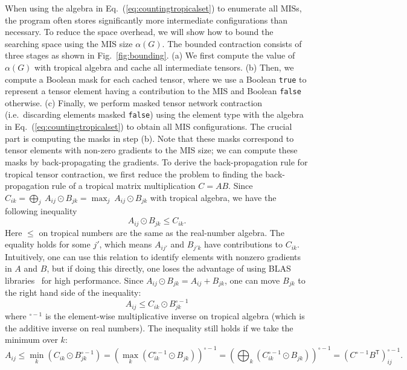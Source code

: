 \documentclass[onefignum, onetabnum]{siamart190516}
\newcommand{\<}{\langle}
\renewcommand{\>}{\rangle}
\newcommand{\Eq}[1]{Eq.~(\ref{#1})}
\newcommand{\Fig}[1]{Fig.~\ref{#1}}
\begin{document}
When using the algebra in \Eq{eq:countingtropicalset} to enumerate all MISs, the program often stores significantly more intermediate configurations than necessary.
To reduce the space overhead, we will show how to bound the searching space using the MIS size $\alpha(G)$.
The bounded contraction consists of three stages as shown in \Fig{fig:bounding}. (a) We first compute the value of $\alpha(G)$ with tropical algebra and cache all intermediate tensors.
(b) Then, we compute a Boolean mask for each cached tensor, where we use a Boolean \texttt{true} to represent a tensor element having a contribution to the MIS and Boolean \texttt{false} otherwise.
(c) Finally, we perform masked tensor network contraction (i.e.\ discarding elements masked \texttt{false}) using the element type with the algebra in \Eq{eq:countingtropicalset} to obtain all MIS configurations.
The crucial part is computing the masks in step (b). Note that these masks correspond to tensor elements with non-zero gradients to the MIS size; we can compute these masks by back-propagating the gradients.
To derive the back-propagation rule for tropical tensor contraction,
we first reduce the problem to finding the back-propagation rule of a tropical matrix multiplication $C = A B$.
Since $ C_{ik} = \bigoplus_{j} \ A_{ij} \odot B_{jk} = \max_{j} \ A_{ij} \odot B_{jk}$ with tropical algebra, we have the following inequality
\begin{equation}
    A_{ij} \odot B_{jk} \leq C_{ik}.
\end{equation}
Here $\leq$ on tropical numbers are the same as the real-number algebra.
The equality holds for some $j'$, which means $A_{ij'}$ and $B_{j'k}$ have contributions to $C_{ik}$.
Intuitively, one can use this relation to identify elements with nonzero gradients in $A$ and $B$,
but if doing this directly, one loses the advantage of using BLAS libraries~\cite{TropicalGEMM} for high performance.
Since $A_{ij} \odot B_{jk} = A_{ij} + B_{jk}$, one can move $B_{jk}$ to the right hand side of the inequality: 
\begin{equation}
    A_{ij} \leq C_{ik} \odot B_{jk}^{\circ -1}
\end{equation}
where ${}^{\circ -1}$ is the element-wise multiplicative inverse on tropical algebra (which is the additive inverse on real numbers).
The inequality still holds if we take the minimum over $k$: 
\begin{equation}
    A_{ij} \leq \min_{k}(C_{ik} \odot B_{jk}^{\circ -1}) = \left(\max_{k} \left(C_{ik}^{\circ -1} \odot B_{jk} \right) \right)^{\circ -1} = \left(\bigoplus_{k} \left(C_{ik}^{\circ -1} \odot B_{jk} \right) \right)^{\circ -1} = \left( C^{\circ-1} B^{\mathsf{T}} \right)^{\circ -1}_{ij}.
\end{equation}
\end{document}
